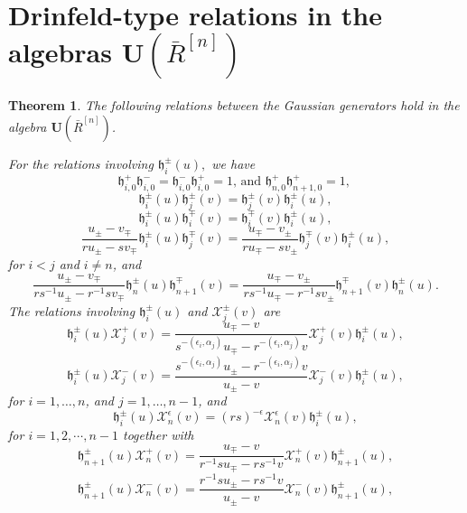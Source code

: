 \documentclass[10pt,a4paper]{amsart}
\newtheorem{theorem}{Theorem}
\numberwithin{equation}{section}
\begin{document}
		\section{ Drinfeld-type relations in the algebras $\boldsymbol{U}\left(\bar{R}^{[n]}\right)$}
			\begin{theorem}
				The following relations between the Gaussian generators hold in the algebra $\boldsymbol{U}\left(\bar{R}^{[n]}\right)$.
				
				For the relations involving $\mathfrak{h}_i^{ \pm}(u),$  we	have $$
				\mathfrak{h}_{i, 0}^{+} \mathfrak{h}_{i, 0}^{-}=\mathfrak{h}_{i, 0}^{-} \mathfrak{h}_{i, 0}^{+}=1 \text {, and } \mathfrak{h}_{n, 0}^{+} \mathfrak{h}_{n+1,0}^{+}=1 \text {, }
				$$
$$\mathfrak{h}_i^{ \pm}(u) \mathfrak{h}_j^{ \pm}(v)=\mathfrak{h}_j^{ \pm}(v) \mathfrak{h}_i^{ \pm}(u),$$
$$
\mathfrak{h}_i^{ \pm}(u) \mathfrak{h}_i^{\mp}(v)=\mathfrak{h}_i^{\mp}(v) \mathfrak{h}_i^{ \pm}(u),
$$
		$$
		\frac{u_{ \pm}-v_{\mp}}{r u_{ \pm}-s v_{\mp}} \mathfrak{h}_i^{ \pm}(u) \mathfrak{h}_j^{\mp}(v)=\frac{u_{\mp}-v_{ \pm}}{r u_{\mp}-s v_{ \pm}} \mathfrak{h}_j^{\mp}(v) \mathfrak{h}_i^{ \pm}(u),
		$$
		for $i<j$ and $i \neq n$, and 	
$$
\frac{u_{ \pm}-v_{\mp}}{r s^{-1} u_{ \pm}-r^{-1} s v_{\mp}} \mathfrak{h}_n^{ \pm}(u) \mathfrak{h}_{n+1}^{\mp}(v)=\frac{u_{\mp}-v_{ \pm}}{r s^{-1} u_{\mp}-r^{-1} s v_{ \pm}} \mathfrak{h}_{n+1}^{\mp}(v) \mathfrak{h}_n^{ \pm}(u) .
$$
The relations involving $\mathfrak{h}_i^{ \pm}(u)$ and $\mathcal{X}_j^{ \pm}(v)$ are
 $$
\mathfrak{h}_i^{ \pm}(u) \mathcal{X}_j^{+}(v)=\frac{u_{\mp}-v}{s^{-\left(\epsilon_i, \alpha_j\right)} u_{\mp}-r^{-\left(\epsilon_i, \alpha_j\right)} v} \mathcal{X}_j^{+}(v) \mathfrak{h}_i^{ \pm}(u),
$$
$$
\mathfrak{h}_i^{ \pm}(u) \mathcal{X}_j^{-}(v)=\frac{s^{-\left(\epsilon_i, \alpha_j\right)} u_{ \pm}-r^{-\left(\epsilon_i, \alpha_j\right)} v}{u_{ \pm}-v} \mathcal{X}_j^{-}(v) \mathfrak{h}_i^{ \pm}(u),
$$
for $i=1, \ldots, n$, and $j=1, \ldots, n-1$, and
$$
\mathfrak{h}_i^{ \pm}(u) \mathcal{X}_n^{\epsilon}(v)=(rs)^{-\epsilon}\mathcal{X}_n^{\epsilon}(v) \mathfrak{h}_i^{ \pm}(u),
$$
for $i=1,2, \cdots ,n-1$ together with
$$
\mathfrak{h}_{n+1}^{ \pm}(u) \mathcal{X}_n^{+}(v)=\frac{u_{\mp}-v}{r^{-1} s u_{\mp}-r s^{-1} v} \mathcal{X}_n^{+}(v) \mathfrak{h}_{n+1}^{ \pm}(u),
$$
$$
\mathfrak{h}_{n+1}^{ \pm}(u) \mathcal{X}_n^{-}(v)=\frac{r^{-1} s u_{ \pm}-r s^{-1} v}{u_{ \pm}-v} \mathcal{X}_n^{-}(v) \mathfrak{h}_{n+1}^{ \pm}(u),
$$
$$
\begin{aligned}

\end{aligned}$$
\end{theorem}
\end{document}
